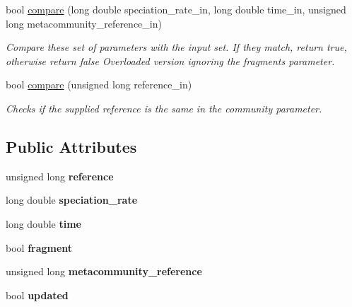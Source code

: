 \begin{DoxyCompactItemize}
bool \hyperlink{struct_community_parameters_a74f0d737ac1d0249d86fede848650ae2}{compare} (long double speciation\+\_\+rate\+\_\+in, long double time\+\_\+in, unsigned long metacommunity\+\_\+reference\+\_\+in)
\begin{DoxyCompactList}\small\item\em Compare these set of parameters with the input set. If they match, return true, otherwise return false Overloaded version ignoring the fragments parameter. \end{DoxyCompactList}\item 
bool \hyperlink{struct_community_parameters_a40a051953654d97d5d5674875d5692cc}{compare} (unsigned long reference\+\_\+in)
\begin{DoxyCompactList}\small\item\em Checks if the supplied reference is the same in the community parameter. \end{DoxyCompactList}\end{DoxyCompactItemize}
\subsection*{Public Attributes}
\begin{DoxyCompactItemize}
\item 
unsigned long {\bfseries reference}\hypertarget{struct_community_parameters_a557474bb5acbee2483cf8176aaf2c2d6}{}\label{struct_community_parameters_a557474bb5acbee2483cf8176aaf2c2d6}

\item 
long double {\bfseries speciation\+\_\+rate}\hypertarget{struct_community_parameters_afafe9532c12b83693d04cf63d56f0133}{}\label{struct_community_parameters_afafe9532c12b83693d04cf63d56f0133}

\item 
long double {\bfseries time}\hypertarget{struct_community_parameters_adb03228a8993f9e2e52f3dda85a96ec8}{}\label{struct_community_parameters_adb03228a8993f9e2e52f3dda85a96ec8}

\item 
bool {\bfseries fragment}\hypertarget{struct_community_parameters_a358d21a0a083749d05f0d01f08f2ca14}{}\label{struct_community_parameters_a358d21a0a083749d05f0d01f08f2ca14}

\item 
unsigned long {\bfseries metacommunity\+\_\+reference}\hypertarget{struct_community_parameters_a10584c438483add52d9d8790256f2cc0}{}\label{struct_community_parameters_a10584c438483add52d9d8790256f2cc0}

\item 
bool {\bfseries updated}\hypertarget{struct_community_parameters_aada886c5f72515e6eca62efdcccf47b7}{}\label{struct_community_parameters_aada886c5f72515e6eca62efdcccf47b7}

\end{DoxyCompactItemize}


